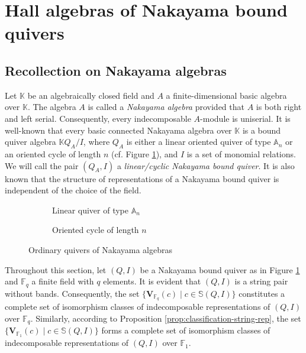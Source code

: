 \documentclass[12pt]{amsart}
\theoremstyle{remark}
\theoremstyle{definition}
\numberwithin{equation}{section}
\begin{document}
\section{Hall algebras of Nakayama bound quivers}\label{s:hall-algebra-nakayama-quiver}


\subsection{Recollection on Nakayama algebras}\label{ss:structure-nakayama-algebra}
Let $\mathbb{K}$ be an algebraically closed field and $A$ a finite-dimensional basic algebra over $\mathbb{K}$. The algebra $A$ is called a {\it Nakayama algebra} provided that $A$ is both right and left serial. Consequently,  every indecomposable $A$-module is uniserial. It is  well-known that every basic connected Nakayama algebra over $\mathbb{K}$ is a bound quiver algebra $\mathbb{K}Q_A/I$, where  $Q_A$ is either a linear oriented quiver of type $\mathbb{A}_n$ or an oriented cycle of length $n$ (cf. Figure \ref{fig:quiver-nakayama}), and $I$ is a set of monomial  relations. We will call the pair $(Q_A,I)$ a {\it linear/cyclic Nakayama bound quiver}. It is also known that the structure of representations of a Nakayama bound quiver is independent of the choice of the field.

\begin{figure}[ht]
    \centering
    \begin{subfigure}{0.45\textwidth}
    \centering
        \caption{Linear quiver of type $\mathbb{A}_n$}
    \end{subfigure}
    \begin{subfigure}{0.45\textwidth}
        \caption{Oriented cycle of length $n$}
    \end{subfigure}
   
    \caption{Ordinary quivers of Nakayama algebras}
    \label{fig:quiver-nakayama}
\end{figure}
Throughout this section, let $(Q,I)$ be a Nakayama bound quiver as in Figure \ref{fig:quiver-nakayama} and $\mathbb{F}_q$ a finite field with $q$ elements. It is evident that $(Q,I)$ is a string pair without bands. Consequently, the set $\{\mathbf{V}_{\mathbb{F}_q}(c) \mid c \in \mathbb{S}(Q,I)\}$ constitutes a complete set of isomorphism classes of indecomposable representations of $(Q,I)$ over $\mathbb{F}_q$. Similarly, according to Proposition \ref{prop:classification-string-rep}, the set $\{\mathbf{V}_{\mathbb{F}_1}(c) \mid c \in \mathbb{S}(Q,I)\}$ forms a complete set of isomorphism classes of indecomposable representations of $(Q,I)$ over $\mathbb{F}_1$.
\end{document}
